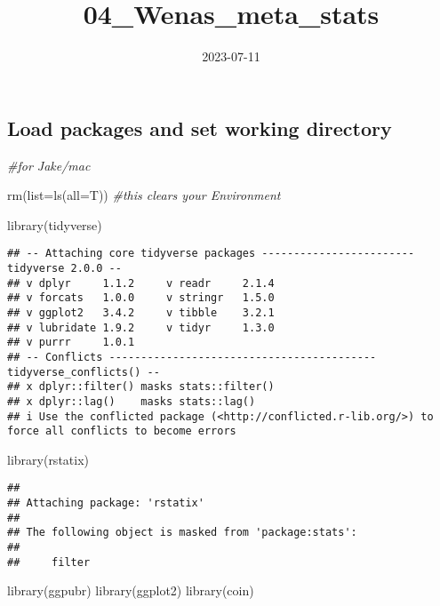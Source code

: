 \documentclass[
]{article}
\title{04\_Wenas\_meta\_stats}
\author{}
\date{\vspace{-2.5em}2023-07-11}
\newenvironment{Shaded}{\begin{snugshade}}{\end{snugshade}}
\newcommand{\AttributeTok}[1]{\textcolor[rgb]{0.77,0.63,0.00}{#1}}
\newcommand{\CommentTok}[1]{\textcolor[rgb]{0.56,0.35,0.01}{\textit{#1}}}
\newcommand{\FunctionTok}[1]{\textcolor[rgb]{0.00,0.00,0.00}{#1}}
\newcommand{\NormalTok}[1]{#1}
\begin{document}
\maketitle

\hypertarget{load-packages-and-set-working-directory}{%
\subsection{Load packages and set working
directory}\label{load-packages-and-set-working-directory}}

\begin{Shaded}
\begin{Highlighting}[]
\CommentTok{\#for Jake/mac}

\FunctionTok{rm}\NormalTok{(}\AttributeTok{list=}\FunctionTok{ls}\NormalTok{(}\AttributeTok{all=}\NormalTok{T)) }\CommentTok{\#this clears your Environment}


\FunctionTok{library}\NormalTok{(tidyverse)}
\end{Highlighting}
\end{Shaded}

\begin{verbatim}
## -- Attaching core tidyverse packages ------------------------ tidyverse 2.0.0 --
## v dplyr     1.1.2     v readr     2.1.4
## v forcats   1.0.0     v stringr   1.5.0
## v ggplot2   3.4.2     v tibble    3.2.1
## v lubridate 1.9.2     v tidyr     1.3.0
## v purrr     1.0.1     
## -- Conflicts ------------------------------------------ tidyverse_conflicts() --
## x dplyr::filter() masks stats::filter()
## x dplyr::lag()    masks stats::lag()
## i Use the conflicted package (<http://conflicted.r-lib.org/>) to force all conflicts to become errors
\end{verbatim}

\begin{Shaded}
\begin{Highlighting}[]
\FunctionTok{library}\NormalTok{(rstatix)}
\end{Highlighting}
\end{Shaded}

\begin{verbatim}
## 
## Attaching package: 'rstatix'
## 
## The following object is masked from 'package:stats':
## 
##     filter
\end{verbatim}

\begin{Shaded}
\begin{Highlighting}[]
\FunctionTok{library}\NormalTok{(ggpubr)}
\FunctionTok{library}\NormalTok{(ggplot2)}
\FunctionTok{library}\NormalTok{(coin)}
\end{Highlighting}
\end{Shaded}
\end{document}
